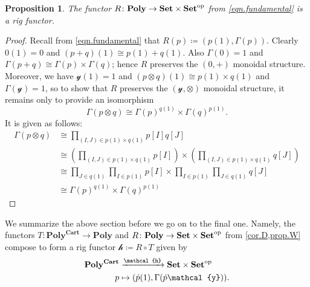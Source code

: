\documentclass[11pt, one side, article]{memoir}
\theoremstyle{definition}
\theoremstyle{plain}
\newtheorem{proposition}[definitionx]{Proposition}
\newenvironment{remark}
  {\pushQED{\qed}\renewcommand{\qedsymbol}{$\lozenge$}\remarkx}
  {\popQED\endremarkx}
\newcommand{\Cat}[1]{\mathbf{#1}}%
\newcommand{\To}[2][]{\xrightarrow[#1]{#2}}
\newcommand{\op}{^\tn{op}}
\newcommand{\tn}[1]{\textnormal{#1}}
\newcommand{\smset}{\Cat{Set}}
\newcommand{\yon}{\mathcal{y}}
\newcommand{\poly}{\Cat{Poly}}
\newcommand{\polycart}{\poly^{\Cat{Cart}}}
\newcommand{\hh}{\mathcal{h}}
\newcommand{\0}{\textsf{0}}
\newcommand{\1}{\tn{\textsf{1}}}
\newcommand{\R}{R}
\newcommand{\T}{T}
\newcommand{\qqand}{\qquad\text{and}\qquad}
\begin{document}
\begin{proposition}\label{prop.W}
The functor $\R\colon\poly\to\smset\times\smset\op$ from \eqref{eqn.fundamental} is a rig functor.
\end{proposition}
\begin{proof}
Recall from \eqref{eqn.fundamental} that $\R(p)\coloneqq(p(1),\Gamma(p))$. Clearly $0(1)=0$ and $(p+q)(1)\cong p(1)+q(1)$. Also $\Gamma(0)=1$ and $\Gamma(p+q)\cong\Gamma(p)\times\Gamma(q)$; hence $\R$ preserves the $(0,+)$ monoidal structure. Moreover, we have $\yon(1)=1$ and $(p\otimes q)(1)\cong p(1)\times q(1)$ and $\Gamma(\yon)= 1$, so to show that $\R$ preserves the $(\yon,\otimes)$ monoidal structure, it remains only to provide an isomorphism 
\[
  \Gamma(p\otimes q)\cong \Gamma(p)^{q(1)}\times\Gamma(q)^{p(1)}.
\]
It is given as follows:
\begin{align*}
	\Gamma(p\otimes q)&\cong
	\prod_{(I,J)\in p(1)\times q(1)}p[I]q[J]\\&\cong
	\left(\prod_{(I,J)\in p(1)\times q(1)}p[I]\right)\times
		\left(\prod_{(I,J)\in p(1)\times q(1)}q[J]\right)\\&\cong
	\prod_{J\in q(1)}\prod_{I\in p(1)}p[I]\times\prod_{I\in p(1)}\prod_{J\in q(1)}q[J]\\&\cong
	\Gamma(p)^{q(1)}\times\Gamma(q)^{p(1)}	
\end{align*}
\end{proof}



We summarize the above section before we go on to the final one. Namely, the functors $\T\colon\polycart\to\poly$ and $\R\colon\poly\to\smset\times\smset\op$ from \cref{cor.D,prop.W} compose to form a rig functor $\hh\coloneqq \R\circ \T$ given by
\begin{equation}\label{eqn.entropy_data}
\begin{aligned}
	\polycart&\To{\mathcal{h}}\smset\times\smset\op\\
	p&\mapsto (\dot{p}(1),\Gamma(\dot{p}\yon)).
\end{aligned}
\end{equation}
\end{document}
